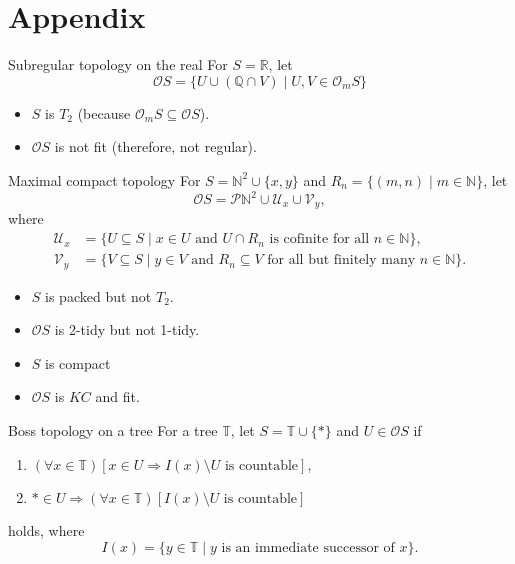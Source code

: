 \documentclass[compress,12pt]{beamer}
\begin{document}
\End
\appendix
\section*{Appendix}
\begin{frame}{Subregular topology on the real}
For $S=\mathbb{R}$, let
\[
\mathcal{O}S=\{U\cup (\mathbb{Q}\cap V)\mid U,V\in \mathcal{O}_mS\}
\]
\begin{itemize}
\item $S$ is $T_2$ (because $\mathcal{O}_mS\subseteq \mathcal{O}S$).
\item $\mathcal{O}S$ is not fit (therefore, not regular). 
\end{itemize}
\end{frame}

\begin{frame}{Maximal compact topology}
For $S=\mathbb{N}^2\cup \{x,y\}$ and $R_n=\{(m,n)\mid m\in \mathbb{N}\}$, let
\[
\mathcal{O}S=\mathcal{P}\mathbb{N}^2\cup \mathcal{U}_x\cup \mathcal{V}_y,
\]
where
\[
\begin{split}
\mathcal{U}_x&=\{U\subseteq S\mid x\in U \mbox{ and }U\cap R_n \mbox{ is cofinite for all }n\in \mathbb{N}\},\\
\mathcal{V}_y&=\{V\subseteq S\mid y\in V \mbox{ and }R_n\subseteq V \mbox{ for all but finitely many }n\in \mathbb{N}\}.
\end{split}
\]
\begin{itemize}
\item $S$ is packed but not $T_2$.
\item $\mathcal{O}S$ is 2-tidy but not 1-tidy.
\item $S$ is compact
\item $\mathcal{O}S$ is $KC$ and fit.
\end{itemize}
\end{frame}

\begin{frame}{Boss topology on a tree}
For a tree $\mathbb{T}$, let $S=\mathbb{T}\cup \{*\}$ and $U\in \mathcal{O}S$ if
\begin{enumerate}
  \item $(\forall x\in \mathbb{T})[x\in U\Rightarrow I(x)\setminus U\mbox{ is countable}]$,
  \item $*\in U\Rightarrow (\forall x\in \mathbb{T})[I(x)\setminus U\mbox{ is countable}]$
\end{enumerate}
holds, where 
\[
I(x)=\{y\in \mathbb{T}\mid y\mbox{ is an immediate successor of }x\}.
\]
\end{frame}
\end{document}
